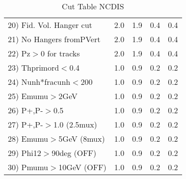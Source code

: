 \begin{table}[h!]
\begin{tabular}{||l||r|r|r|r||}
 20) Fid. Vol. Hanger cut &         2.0 &         1.9 &         0.4 &         0.4 \\
 21) No Hangers fromPVert &         2.0 &         1.9 &         0.4 &         0.4 \\
 22) Pz$>$0 for tracks    &         2.0 &         1.9 &         0.4 &         0.4 \\
 23) Thprimord$<$0.4      &         1.0 &         0.9 &         0.2 &         0.2 \\
 24) Nunh*fracunh$<$200   &         1.0 &         0.9 &         0.2 &         0.2 \\
 25) Emumu$>$2GeV         &         1.0 &         0.9 &         0.2 &         0.2 \\
 26) P+,P-$>$0.5          &         1.0 &         0.9 &         0.2 &         0.2 \\
 27) P+,P-$>$1.0 (2.5mux) &         1.0 &         0.9 &         0.2 &         0.2 \\
 28) Emumu$>$5GeV  (8mux) &         1.0 &         0.9 &         0.2 &         0.2 \\
 29) Phi12$>$90deg  (OFF) &         1.0 &         0.9 &         0.2 &         0.2 \\
 30) Pmumu$>$10GeV  (OFF) &         1.0 &         0.9 &         0.2 &         0.2 \\
 \hline
 \hline
 \end{tabular}
 \caption{Cut Table  NCDIS  }
 \label{tab-cut_ncdis}
 \end{table}
